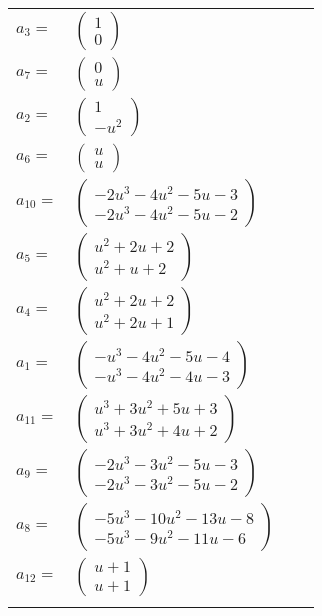 \documentclass[1p]{elsarticle_modified}
\theoremstyle{definition}
\begin{document}
\begin{tabular}{m{7pt} m{180pt} m{7pt} m{180pt} }
\flushright $a_{3}=$&$\begin{pmatrix}1\\0\end{pmatrix}$ \\
\flushright $a_{7}=$&$\begin{pmatrix}0\\u\end{pmatrix}$ \\
\flushright $a_{2}=$&$\begin{pmatrix}1\\- u^2\end{pmatrix}$ \\
\flushright $a_{6}=$&$\begin{pmatrix}u\\u\end{pmatrix}$ \\
\flushright $a_{10}=$&$\begin{pmatrix}-2 u^3-4 u^2-5 u-3\\-2 u^3-4 u^2-5 u-2\end{pmatrix}$ \\
\flushright $a_{5}=$&$\begin{pmatrix}u^2+2 u+2\\u^2+u+2\end{pmatrix}$ \\
\flushright $a_{4}=$&$\begin{pmatrix}u^2+2 u+2\\u^2+2 u+1\end{pmatrix}$ \\
\flushright $a_{1}=$&$\begin{pmatrix}- u^3-4 u^2-5 u-4\\- u^3-4 u^2-4 u-3\end{pmatrix}$ \\
\flushright $a_{11}=$&$\begin{pmatrix}u^3+3 u^2+5 u+3\\u^3+3 u^2+4 u+2\end{pmatrix}$ \\
\flushright $a_{9}=$&$\begin{pmatrix}-2 u^3-3 u^2-5 u-3\\-2 u^3-3 u^2-5 u-2\end{pmatrix}$ \\
\flushright $a_{8}=$&$\begin{pmatrix}-5 u^3-10 u^2-13 u-8\\-5 u^3-9 u^2-11 u-6\end{pmatrix}$ \\
\flushright $a_{12}=$&$\begin{pmatrix}u+1\\u+1\end{pmatrix}$\\&\end{tabular}
\end{document}
